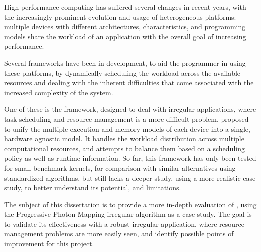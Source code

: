 \documentclass[main.tex]{subfiles}
\begin{document}
High performance computing has suffered several changes in recent years, with the increasingly prominent evolution and usage of heterogeneous platforms: multiple devices with different architectures, characteristics, and programming models share the workload of an application with the overall goal of increasing performance.

Several frameworks have been in development, to aid the programmer in using these platforms, by dynamically scheduling the workload across the available resources and dealing with the inherent difficulties that come associated with the increased complexity of the system.

One of these is the \gama framework, designed to deal with irregular applications, where task scheduling and resource management is a more difficult problem. \gama proposed to unify the multiple execution and memory models of each device into a single, hardware agnostic model. It handles the workload distribution across multiple computational resources, and attempts to balance them based on a scheduling policy as well as runtime information. So far, this framework has only been tested for small benchmark kernels, for comparison with similar alternatives using standardized algorithms, but still lacks a deeper study, using a more realistic case study, to better understand its potential, and limitations.

The subject of this dissertation is to provide a more in-depth evaluation of \gama, using the Progressive Photon Mapping irregular algorithm as a case study. The goal is to validate its effectiveness with a robust irregular application, where resource management problems are more easily seen, and identify possible points of improvement for this project.

\newpage
{}
\end{document}
